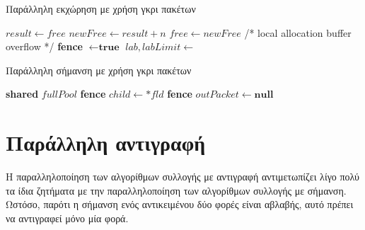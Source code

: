 \begin{greek}
\begin{algorithm}
  \caption{Παράλληλη εκχώρηση με χρήση γκρι πακέτων}
  \label{alg:par_6}
  \begin{algorithmic}[1]
      \State $result \gets free$
      \State $newFree \gets result + n$
        \State $free \gets newFree$
        \State {}
      \EndIf
      \Statex
      \State /* local allocation buffer overflow */
      \State \textbf{fence}
        \State {} $\gets \textbf{true}$
      \EndFor
      \State $lab, labLimit \gets$ 
        \State {}
      \EndIf
      \State {} 
    \EndFunction
  \end{algorithmic}
\end{algorithm}

\begin{algorithm}
  \caption{Παράλληλη σήμανση με χρήση γκρι πακέτων}
  \label{alg:par_7}
  \begin{algorithmic}[1]
    \State \textbf{shared} $fullPool$ 
    \Statex
          \State {}
          \State \textbf{fence}
        \EndIf
      \EndIf
    \EndProcedure
    \Statex
            \State $child \gets *fld$
              \State {}
              \State {}
            \EndIf
          \EndFor   
        \Else
          \State {} 
        \EndIf
      \EndFor
    \EndProcedure
    \Statex
      \State \textbf{fence}
      \State {}
      \State $outPacket \gets \textbf{null}$
    \EndProcedure
  \end{algorithmic}
\end{algorithm}

\section{Παράλληλη αντιγραφή}
Η παραλληλοποίηση των αλγορίθμων συλλογής με αντιγραφή αντιμετωπίζει
λίγο πολύ τα ίδια ζητήματα με την παραλληλοποίηση των αλγορίθμων
συλλογής με σήμανση. Ωστόσο, παρότι η σήμανση ενός αντικειμένου
δύο φορές είναι αβλαβής, αυτό πρέπει να αντιγραφεί μόνο μία φορά.


\end{greek}
